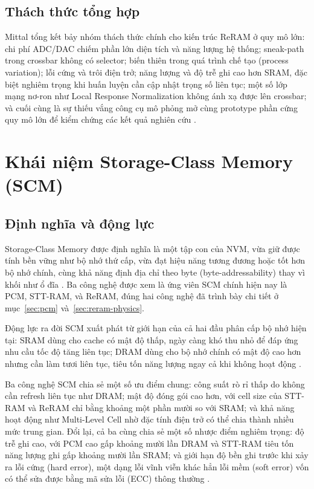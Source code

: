\documentclass[12pt,a4paper]{article}
\begin{document}
\subsection{Thách thức tổng hợp}

Mittal tổng kết bảy nhóm thách thức chính cho kiến trúc ReRAM ở quy mô lớn: chi phí ADC/DAC chiếm phần lớn diện tích và năng lượng hệ thống; sneak-path trong crossbar không có selector; biến thiên trong quá trình chế tạo (process variation); lỗi cứng và trôi điện trở; năng lượng và độ trễ ghi cao hơn SRAM, đặc biệt nghiêm trọng khi huấn luyện cần cập nhật trọng số liên tục; một số lớp mạng nơ-ron như Local Response Normalization không ánh xạ được lên crossbar; và cuối cùng là sự thiếu vắng công cụ mô phỏng mở cùng prototype phần cứng quy mô lớn để kiểm chứng các kết quả nghiên cứu \cite{mittal2019}.

\section{Khái niệm Storage-Class Memory (SCM)}
\label{sec:scm}

\subsection{Định nghĩa và động lực}

Storage-Class Memory được định nghĩa là một tập con của NVM, vừa giữ được tính bền vững như bộ nhớ thứ cấp, vừa đạt hiệu năng tương đương hoặc tốt hơn bộ nhớ chính, cùng khả năng định địa chỉ theo byte (byte-addressability) thay vì khối như ổ đĩa \cite{kamath2019}. Ba công nghệ được xem là ứng viên SCM chính hiện nay là PCM, STT-RAM, và ReRAM, đúng hai công nghệ đã trình bày chi tiết ở mục~\ref{sec:pcm} và~\ref{sec:reram-physics}.

Động lực ra đời SCM xuất phát từ giới hạn của cả hai đầu phân cấp bộ nhớ hiện tại: SRAM dùng cho cache có mật độ thấp, ngày càng khó thu nhỏ để đáp ứng nhu cầu tốc độ tăng liên tục; DRAM dùng cho bộ nhớ chính có mật độ cao hơn nhưng cần làm tươi liên tục, tiêu tốn năng lượng ngay cả khi không hoạt động \cite{kamath2019}.

Ba công nghệ SCM chia sẻ một số ưu điểm chung: công suất rò rỉ thấp do không cần refresh liên tục như DRAM; mật độ đóng gói cao hơn, với cell size của STT-RAM và ReRAM chỉ bằng khoảng một phần mười so với SRAM; và khả năng hoạt động như Multi-Level Cell nhờ đặc tính điện trở có thể chia thành nhiều mức trung gian. Đổi lại, cả ba cùng chia sẻ một số nhược điểm nghiêm trọng: độ trễ ghi cao, với PCM cao gấp khoảng mười lần DRAM và STT-RAM tiêu tốn năng lượng ghi gấp khoảng mười lần SRAM; và giới hạn độ bền ghi trước khi xảy ra lỗi cứng (hard error), một dạng lỗi vĩnh viễn khác hẳn lỗi mềm (soft error) vốn có thể sửa được bằng mã sửa lỗi (ECC) thông thường \cite{kamath2019}.
\end{document}
